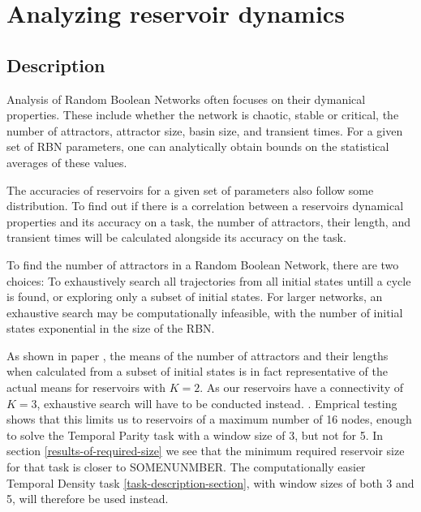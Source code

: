 \section{Analyzing reservoir dynamics}

\subsection{Description}

Analysis of Random Boolean Networks often focuses on their dymanical properties.
These include whether the network is chaotic, stable or critical,
the number of attractors, attractor size, basin size, and transient times.
For a given set of RBN parameters, one can analytically obtain bounds on the statistical averages of these values.

The accuracies of reservoirs for a given set of parameters also follow some distribution.
To find out if there is a correlation between a reservoirs dynamical properties and its accuracy on a task,
the number of attractors, their length, and transient times will be calculated alongside its accuracy on the task.

To find the number of attractors in a Random Boolean Network, there are two choices:
To exhaustively search all trajectories from all initial states untill a cycle is found,
or exploring only a subset of initial states.
For larger networks, an exhaustive search may be computationally infeasible,
with the number of initial states exponential in the size of the RBN.

As shown in paper ,
the means of the number of attractors and their lengths when calculated from a subset of initial states is in fact representative of the actual means for reservoirs with $K=2$.
As our reservoirs have a connectivity of $K = 3$, exhaustive search will have to be conducted instead.
.
Emprical testing shows that this limits us to reservoirs of a maximum number of 16 nodes,
enough to solve the Temporal Parity task with a window size of 3, but not for 5.
In section \ref{results-of-required-size} we see that the minimum required reservoir size for that task is closer to SOMENUNMBER.
The computationally easier Temporal Density task \ref{task-description-section},
with window sizes of both 3 and 5,
will therefore be used instead.


